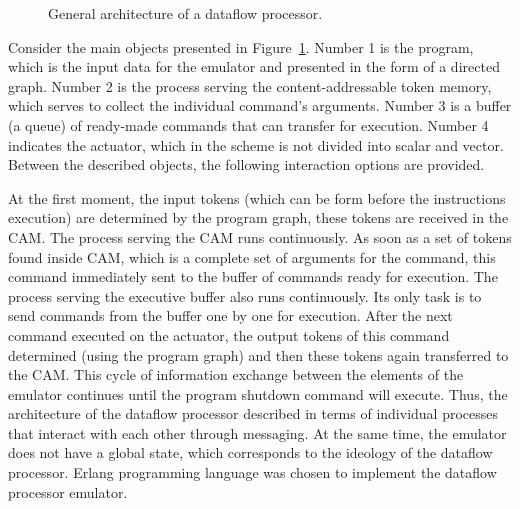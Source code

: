 \documentclass[
11pt,%
tightenlines,%
twoside,%
onecolumn,%
nofloats,%
nobibnotes,%
nofootinbib,%
superscriptaddress,%
noshowpacs,%
centertags]%
{revtex4}
\begin{document}
\begin{figure}[h!]
\setcaptionmargin{5mm}
\onelinecaptionsfalse
{}
\caption{General architecture of a dataflow processor.}
\label{fig:big-scheme}
\end{figure}


Consider the main objects presented in Figure~\ref{fig:big-scheme}. Number 1 is the program, which is the input data for the emulator and presented in the form of a directed graph. Number 2 is the process serving the content-addressable token memory, which serves to collect the individual command's arguments. Number 3 is a buffer (a queue) of ready-made commands that can transfer for execution. Number 4 indicates the actuator, which in the scheme is not divided into scalar and vector. Between the described objects, the following interaction options are provided.

At the first moment, the input tokens (which can be form before the instructions execution) are determined by the program graph, these tokens are received in the CAM. The process serving the CAM runs continuously. As soon as a set of tokens found inside CAM, which is a complete set of arguments for the command, this command immediately sent to the buffer of commands ready for execution. The process serving the executive buffer also runs continuously. Its only task is to send commands from the buffer one by one for execution. After the next command executed on the actuator, the output tokens of this command determined (using the program graph) and then these tokens again transferred to the CAM. This cycle of information exchange between the elements of the emulator continues until the program shutdown command will execute. Thus, the architecture of the dataflow processor described in terms of individual processes that interact with each other through messaging. At the same time, the emulator does not have a global state, which corresponds to the ideology of the dataflow processor. Erlang programming language \cite{Armstrong,Cesarini} was chosen to implement the dataflow processor emulator.
\end{document}
